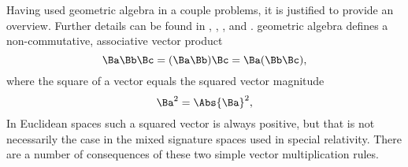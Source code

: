 %
%
%
Having used geometric algebra in a couple problems, it is justified to provide an overview.  Further details can be found in
\citep{dorst2007gac},
\citep{doran2003gap},
\citep{aMacdonaldVAGC},
and
\citep{hestenes1999nfc}.
%
geometric algebra defines a non-commutative, associative vector product
%
\begin{equation}\label{eqn:gaTutorial:20}
\Ba \Bb \Bc
=
(\Ba \Bb) \Bc
=
\Ba (\Bb \Bc),
\end{equation}
%
where the square of a vector equals the squared vector magnitude
%
\begin{equation}\label{eqn:gaTutorial:40}
\Ba^2 = \Abs{\Ba}^2,
\end{equation}
%
In Euclidean spaces such a squared vector is always positive, but that is not necessarily the case in the mixed signature spaces used in special relativity.
%
There are a number of consequences of these two simple vector multiplication rules.
%
